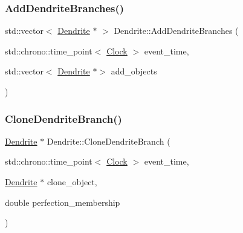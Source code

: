\mbox{\label{classDendrite_a3e6a80da180b60290545cfc92f221a05}} 
\subsubsection{\texorpdfstring{Add\+Dendrite\+Branches()}{AddDendriteBranches()}}
{\footnotesize\ttfamily std\+::vector$<$ \mbox{\hyperlink{classDendrite}{Dendrite}} $\ast$ $>$ Dendrite\+::\+Add\+Dendrite\+Branches (\begin{DoxyParamCaption}\item[{std\+::chrono\+::time\+\_\+point$<$ \mbox{\hyperlink{universe_8h_a0ef8d951d1ca5ab3cfaf7ab4c7a6fd80}{Clock}} $>$}]{event\+\_\+time,  }\item[{std\+::vector$<$ \mbox{\hyperlink{classDendrite}{Dendrite}} $\ast$$>$}]{add\+\_\+objects }\end{DoxyParamCaption})}

\mbox{\label{classDendrite_ab682ffb9bfd1a1da1623e6b641471068}} 
\subsubsection{\texorpdfstring{Clone\+Dendrite\+Branch()}{CloneDendriteBranch()}}
{\footnotesize\ttfamily \mbox{\hyperlink{classDendrite}{Dendrite}} $\ast$ Dendrite\+::\+Clone\+Dendrite\+Branch (\begin{DoxyParamCaption}\item[{std\+::chrono\+::time\+\_\+point$<$ \mbox{\hyperlink{universe_8h_a0ef8d951d1ca5ab3cfaf7ab4c7a6fd80}{Clock}} $>$}]{event\+\_\+time,  }\item[{\mbox{\hyperlink{classDendrite}{Dendrite}} $\ast$}]{clone\+\_\+object,  }\item[{double}]{perfection\+\_\+membership }\end{DoxyParamCaption})}

\mbox{\label{classDendrite_abd67c09df69c520e6720bca2592bcc99}} 
